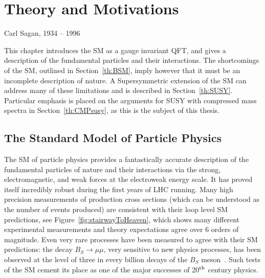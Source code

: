 \chapter{Theory and Motivations}
\label{chap:theory}




{Carl Sagan, 1934 -- 1996}%


This chapter introduces the \ac{SM} as a gauge invariant \ac{QFT}, and gives a description of the fundamental particles and their interactions.
The shortcomings of the \ac{SM}, outlined in Section~\ref{th:BSM}, imply however that it must be an incomplete description of nature. 
A Supersymmetric extension of the SM can address many of these limitations and is described in Section~\ref{th:SUSY}. 
Particular emphasis is placed on the arguments for \ac{SUSY} with compressed mass spectra in Section~\ref{th:CMPsusy}, as this is the subject of this thesis.

\section{The Standard Model of Particle Physics \label{th:sm}}

The \ac{SM} of particle physics provides a fantastically accurate description of the fundamental particles of nature and their interactions via the strong, electromagnetic, and weak forces at the electroweak energy scale.
It has proved itself incredibly robust during the first years of \ac{LHC} running. 
Many high precision measurements of production cross sections (which can be understood as the number of events produced) are consistent with their loop level \ac{SM} predictions, see Figure~\ref{fig:stairwayToHeaven}, 
which shows many different experimental measurements and theory expectations agree over 6 orders of magnitude.
Even very rare processes have been measured to agree with their \ac{SM} predictions: the decay $B_{S}\rightarrow \mu\mu$, very sensitive to new physics processes, has been observed at the level of three in every billion decays of the $B_{S}$ meson~\cite{BSmumuCombo}.
Such tests of the \ac{SM} cement its place as one of the major successes of 20$^{\rm th}$ century physics.


